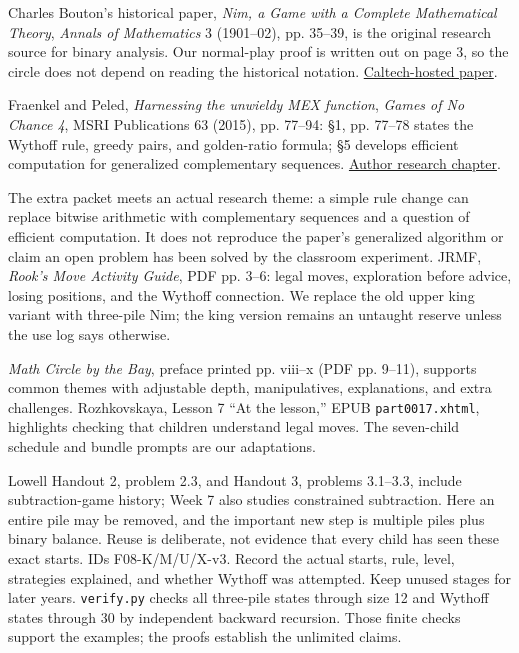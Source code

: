 \documentclass[11pt]{article}
\begin{document}
Charles Bouton's historical paper, \emph{Nim, a Game with a Complete Mathematical Theory}, \emph{Annals of Mathematics} 3 (1901--02), pp. 35--39, is the original research source for binary analysis. Our normal-play proof is written out on page 3, so the circle does not depend on reading the historical notation. \href{https://paradise.caltech.edu/ist4/lectures/Bouton1901.pdf}{Caltech-hosted paper}.

Fraenkel and Peled, \emph{Harnessing the unwieldy MEX function}, \emph{Games of No Chance 4}, MSRI Publications 63 (2015), pp. 77--94: \S1, pp. 77--78 states the Wythoff rule, greedy pairs, and golden-ratio formula; \S5 develops efficient computation for generalized complementary sequences. \href{https://library.slmath.org/books/Book63/files/131104-Fraenkel-2.pdf}{Author research chapter}.

The extra packet meets an actual research theme: a simple rule change can replace bitwise arithmetic with complementary sequences and a question of efficient computation. It does not reproduce the paper's generalized algorithm or claim an open problem has been solved by the classroom experiment.
JRMF, \emph{Rook's Move Activity Guide}, PDF pp. 3--6: legal moves, exploration before advice, losing positions, and the Wythoff connection. We replace the old upper king variant with three-pile Nim; the king version remains an untaught reserve unless the use log says otherwise.

\emph{Math Circle by the Bay}, preface printed pp. viii--x (PDF pp. 9--11), supports common themes with adjustable depth, manipulatives, explanations, and extra challenges. Rozhkovskaya, Lesson 7 ``At the lesson,'' EPUB \texttt{part0017.xhtml}, highlights checking that children understand legal moves. The seven-child schedule and bundle prompts are our adaptations.

Lowell Handout 2, problem 2.3, and Handout 3, problems 3.1--3.3, include subtraction-game history; Week 7 also studies constrained subtraction. Here an entire pile may be removed, and the important new step is multiple piles plus binary balance. Reuse is deliberate, not evidence that every child has seen these exact starts.
IDs F08-K/M/U/X-v3. Record the actual starts, rule, level, strategies explained, and whether Wythoff was attempted. Keep unused stages for later years. \texttt{verify.py} checks all three-pile states through size 12 and Wythoff states through 30 by independent backward recursion. Those finite checks support the examples; the proofs establish the unlimited claims.
\end{document}
